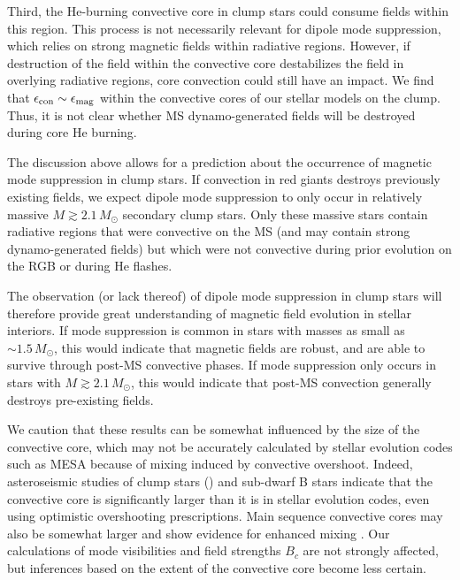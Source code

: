 Third, the He-burning convective core in clump stars could consume fields within this region. This process is not necessarily relevant for dipole mode suppression, which relies on strong magnetic fields within radiative regions. However, if destruction of the field within the convective core destabilizes the field in overlying radiative regions, core convection could still have an impact. We find that $\epsilon_{\rm con} \sim \epsilon_{\rm mag}$ within the convective cores of our stellar models on the clump. Thus, it is not clear whether MS dynamo-generated fields will be destroyed during core He burning. 

The discussion above allows for a prediction about the occurrence of magnetic mode suppression in clump stars. If convection in red giants destroys previously existing fields, we expect dipole mode suppression to only occur in relatively massive $M \gtrsim 2.1 \, M_\odot$ secondary clump stars. Only these massive stars contain radiative regions that were convective on the MS (and may contain strong dynamo-generated fields) but which were not convective during prior evolution on the RGB or during He flashes. 

The observation (or lack thereof) of dipole mode suppression in clump stars will therefore provide great understanding of magnetic field evolution in stellar interiors. If mode suppression is common in stars with masses as small as $\sim \! 1.5 \, M_\odot$, this would indicate that magnetic fields are robust, and are able to survive through post-MS convective phases. If mode suppression only occurs in stars with $M \gtrsim 2.1 \, M_\odot$, this would indicate that post-MS convection generally destroys pre-existing fields. 

We caution that these results can be somewhat influenced by the size of the convective core, which may not be accurately calculated by stellar evolution codes such as MESA  because of mixing induced by convective overshoot. Indeed, asteroseismic studies of clump stars (\cite{montalban_2013,stello_2013,mosser_2014,bossini_2015,constantino_2015}) and sub-dwarf B stars \citep{vangrootel_2010a,vangrootel_2010b,charpinet_2011,Schindler_2015} indicate that the convective core is significantly larger than it is in stellar evolution codes, even using optimistic overshooting prescriptions. Main sequence convective cores may also be somewhat larger and show evidence for enhanced mixing \citep{moravveji_2015}.  Our calculations of mode visibilities and field strengths $B_c$ are not strongly affected, but inferences based on the extent of the convective core become less certain.
    
    